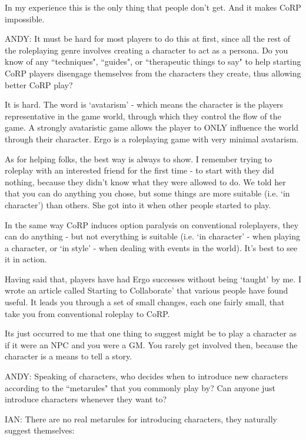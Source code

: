 \documentclass[twoside]{book}
\begin{document}
\begin{description}
In my experience this is the only thing that people don't get. And it makes CoRP impossible.

\item{ANDY:} It must be hard for most players to do this at first, since all the rest of the roleplaying genre involves creating a character to act as a persona. Do you know of any ``techniques", ``guides", or ``therapeutic things to say" to help starting CoRP players disengage themselves from the characters they create, thus allowing better CoRP play?

It is hard. The word is `avatarism' - which means the character is the players representative in the game world, through which they control the flow of the game. A strongly avataristic game allows the player to ONLY influence the world through their character. Ergo is a roleplaying game with very minimal avatarism.

As for helping folks, the best way is always to show. I remember trying to roleplay with an interested friend for the first time - to start with they did nothing, because they didn't know what they were allowed to do. We told her that you can do anything you chose, but some things are more suitable (i.e. `in character') than others. She got into it when other people started to play.

In the same way CoRP induces option paralysis on conventional roleplayers, they can do anything - but not everything is suitable (i.e. `in character' - when playing a character, or `in style' - when dealing with events in the world). It's best to see it in action.

Having said that, players have had Ergo successes without being `taught' by me. I wrote an article called Starting to Collaborate' that various people have found useful. It leads you through a set of small changes, each one fairly small, that take you from conventional roleplay to CoRP.

Its just occurred to me that one thing to suggest might be to play a character as if it were an NPC and you were a GM. You rarely get involved then, because the character is a means to tell a story.

\item{ANDY:} Speaking of characters, who decides when to introduce new characters according to the ``metarules" that you commonly play by? Can anyone just introduce characters whenever they want to?

\item{IAN:} There are no real metarules for introducing characters, they naturally suggest themselves:


\end{description}
\end{document}
